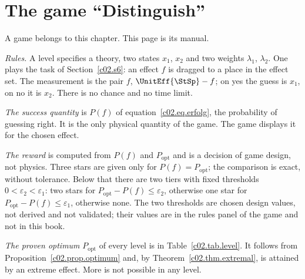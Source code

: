 \section{The game “Distinguish”}\label{c02.s7}

A game belongs to this chapter. This page is its manual.

\emph{Rules.} A level specifies a theory, two states $x_1$, $x_2$ and two weights
$\lambda_1$, $\lambda_2$. One plays the task of Section~\ref{c02.s6}: an effect $f$ is
dragged to a place in the effect set. The measurement is the pair $f$,
$\UnitEff{\StSp} - f$; on yes the guess is $x_1$, on no it is $x_2$. There is no chance and
no time limit.

\emph{The success quantity} is $P(f)$ of equation~\eqref{c02.eq.erfolg}, the probability
of guessing right. It is the only physical quantity of the game. The game displays it for
the chosen effect.

\emph{The reward} is computed from $P(f)$ and $P_{\mathrm{opt}}$ and is a decision of game
design, not physics. Three stars are given only for $P(f) = P_{\mathrm{opt}}$; the
comparison is exact, without tolerance. Below that there are two tiers with fixed
thresholds $0 < \varepsilon_2 < \varepsilon_1$: two stars for
$P_{\mathrm{opt}} - P(f) \leq \varepsilon_2$, otherwise one star for
$P_{\mathrm{opt}} - P(f) \leq \varepsilon_1$, otherwise none. The two thresholds are
chosen design values, not derived and not validated; their values are in the rules panel
of the game and not in this book.

\emph{The proven optimum} $P_{\mathrm{opt}}$ of every level is in
Table~\ref{c02.tab.level}. It follows from Proposition~\ref{c02.prop.optimum} and, by
Theorem~\ref{c02.thm.extremal}, is attained by an extreme effect. More is not possible in
any level.


